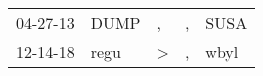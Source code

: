 \begin{supertabular}{lllll}
 04-27-13 &  DUMP &             , &  , &  SUSA \\
 12-14-18 &  regu &  \textgreater &  , &  wbyl \\
\end{supertabular}
